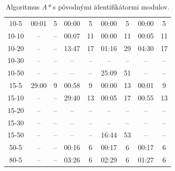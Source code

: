 \documentclass[
  printed, %
  oneside, %
  notable,   %
  nolof,     %
  nolot,     %
]{fithesis3}
\begin{document}
\begin{table}[hp!]
\begin{tabular}{c|cc|cc|cc|cc}
10-5  & 00:01 & 5  & 00:00 & 5  & \cellcolor{table-green}00:00 & \cellcolor{table-green}5  & 00:00 & 5  \\
10-10  & -- & --  & 00:07 & 11  & \cellcolor{table-green}00:00 & \cellcolor{table-green}11  & 00:05 & 11  \\
10-20  & -- & --  & 13:47 & 17  & \cellcolor{table-green}01:16 & \cellcolor{table-green}29  & 04:30 & 17  \\
10-30  & -- & --  & -- & --  & -- & --  & -- & --  \\
10-50  & -- & --  & -- & --  & \cellcolor{table-green}25:09 & \cellcolor{table-green}51  & -- & --  \\ \hline
15-5  & 29:00 & 9  & 00:58 & 9  & \cellcolor{table-green}00:00 & \cellcolor{table-green}13  & 00:01 & 9  \\
15-10  & -- & --  & 29:40 & 13  & \cellcolor{table-green}00:05 & \cellcolor{table-green}17  & 00:55 & 13  \\
15-20  & -- & --  & -- & --  & -- & --  & -- & --  \\
15-30  & -- & --  & -- & --  & -- & --  & -- & --  \\
15-50  & -- & --  & -- & --  & \cellcolor{table-green}16:44 & \cellcolor{table-green}53  & -- & --  \\ \hline
50-5  & -- & --  & \cellcolor{table-green}00:16 & \cellcolor{table-green}6  & 00:17 & 6  & 00:17 & 6  \\ \hline
80-5  & -- & --  & 03:26 & 6  & 02:29 & 6  & \cellcolor{table-green}01:27 & \cellcolor{table-green}6  \\

\end{tabular}%
\caption{Algoritmus \textit{A*} s pôvodnými identifikátormi modulov. }
\label{tab:astar-orig}
\end{table}
\end{document}
